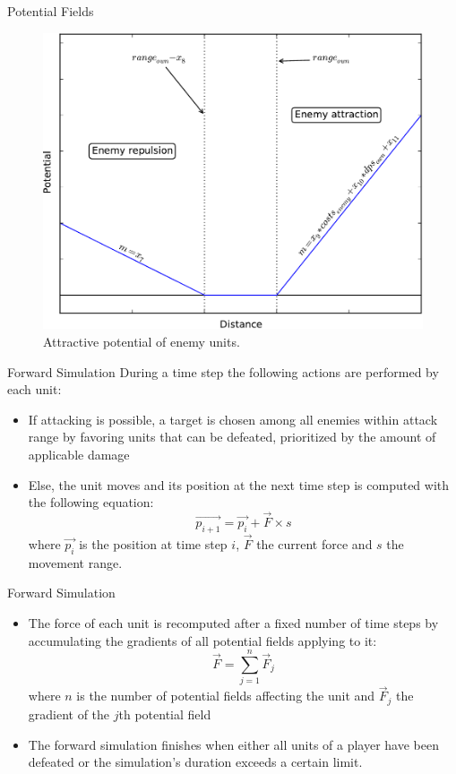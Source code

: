 \documentclass{beamer}
\begin{document}
\begin{frame}{Potential Fields}
\begin{center}
\begin{figure}[h]
	\includegraphics[width=0.5\linewidth]{enemy2-crop.pdf}
	\caption{Attractive potential of enemy units.}
	\label{fig:graph_enemy2}
\end{figure}
\end{center}
\end{frame}
\begin{frame}{Forward Simulation}
During a time step the following actions are performed by each unit:
\begin{itemize}
\item If \alert{attacking} is possible, a target is chosen among all enemies within attack range by favoring units that can be defeated, prioritized by the amount of applicable damage
\item Else, the unit \alert{moves} and its position at the next time step is computed with the following equation:
	\begin{equation*}
		\vec{p_{i+1}} = \vec{p_i} +\vec{F} \times s
	\end{equation*}
	where $\vec{p_i}$ is the position at time step $i$, $\vec{F}$ the current force and $s$ the movement range. 
\end{itemize}
\end{frame}

\begin{frame}{Forward Simulation}
\begin{itemize}
\item The \alert{force} of each unit is recomputed after a fixed number of time steps by accumulating the gradients of all potential fields applying to it:
	\begin{equation*}
		\vec{F} = \sum_{j=1}^n \vec{F}_j
	\end{equation*}
	where $n$ is the number of potential fields affecting the unit and $\vec{F}_j$ the gradient of the $j$th potential field
\item The forward simulation finishes when either all units of a player have been defeated or the simulation’s duration exceeds a certain limit.
\end{itemize}
\end{frame}
\end{document}
